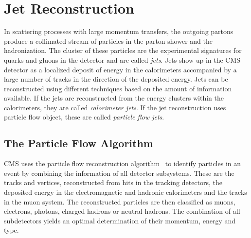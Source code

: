 \chapter{Jet Reconstruction}

In scattering processes with large momentum transfers, the outgoing partons
produce a collimated stream of particles in the parton shower and the
hadronization. The cluster of these particles are the experimental signatures
for quarks and gluons in the detector and are called \emph{jets}. Jets show up
in the CMS detector as a localized deposit of energy in the calorimeters
accompanied by a large number of tracks in the direction of the deposited
energy. Jets can be reconstructed using different techniques based on the amount
of information available. If the jets are reconstructed from the energy clusters
within the calorimeters, they are called \emph{calorimeter jets}. If the jet
reconstruction uses particle flow object, these are called \emph{particle flow
jets}.

\section{The Particle Flow Algorithm}

CMS uses the particle flow reconstruction
algorithm~\cite{CMS-PAS-PFT-09-001,CMS-PAS-PFT-10-001} to identify particles in
an event by combining the information of all detector subsystems. These are the
tracks and vertices, reconstructed from hits in the tracking detectors, the
deposited energy in the electromagnetic and hadronic calorimeters and the tracks
in the muon system. The reconstructed particles are then classified as muons,
electrons, photons, charged hadrons or neutral hadrons. The combination of all
subdetectors yields an optimal determination of their momentum, energy and type.

